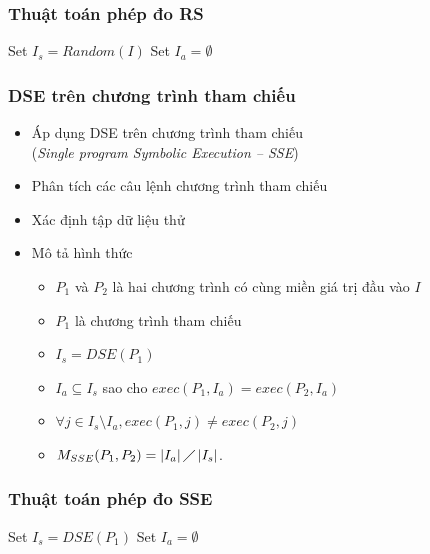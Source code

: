 \documentclass{beamer}
\begin{document}
\begin{frame}
  \frametitle{Thuật toán phép đo RS}
  \begin{algorithm}[H]
	Set $I_{s} = Random(I)$ \;
	Set $I_{a} = \emptyset$\;
  	{  			
  	}
  \end{algorithm}
\end{frame}


\begin{frame}
  \frametitle{DSE trên chương trình tham chiếu}
  \begin{itemize}
  	\item Áp dụng DSE trên chương trình tham chiếu
  	\\ (\emph{Single program Symbolic Execution -- SSE})
  	\item Phân tích các câu lệnh chương trình tham chiếu
  	\item Xác định tập dữ liệu thử
  	\item Mô tả hình thức
  	\begin{itemize}
	\item $P_{1}$ và $P_{2}$ là hai chương trình có cùng miền giá trị đầu
	vào $I$
	\item $P_{1}$ là chương trình tham chiếu
	\item $I_{s} = DSE(P_{1})$
	\item $I_{a} \subseteq I_s$ sao cho
	$exec(P_{1}, I_a) = exec(P_{2}, I_a)$
	\item $\forall j \in I_{s} \setminus I_{a}, exec(P_{1}, j) \neq
	exec(P_{2}, j)$
	\item $M_{SSE}(P_{1}, P_{2}) = \left|I_{a}\right| \diagup
	\left|I_{s}\right| $.
  	\end{itemize}
  \end{itemize}
\end{frame}


\begin{frame}
  \frametitle{Thuật toán phép đo SSE}
  \begin{algorithm}[H]
  	Set $I_{s} = DSE(P_{1})$ \;
  	Set $I_{a} = \emptyset$ \;
  	{  			
  	}
  \end{algorithm}
\end{frame}
\end{document}
